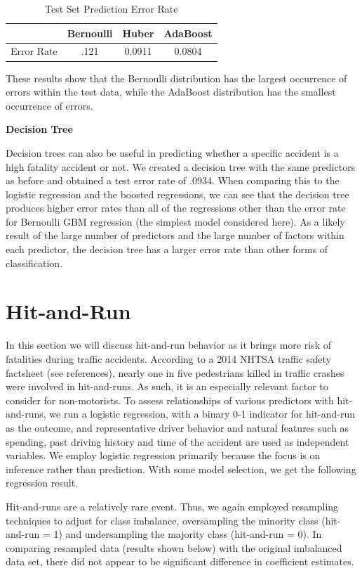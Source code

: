 \documentclass[11pt, oneside,titlepage]{article}   	%
\begin{document}
\begin{table}[H]
\centering
\begin{tabular}{cccc}
  \hline
 & Bernoulli & Huber & AdaBoost \\ 
  \hline
Error Rate & .121 & 0.0911 & 0.0804 \\ 
   \hline
\end{tabular}
\caption{Test Set Prediction Error Rate} 
\end{table}

These results show that the Bernoulli distribution has the largest occurrence of errors within the test data, while the AdaBoost distribution has the smallest occurrence of errors.

\textbf{Decision Tree}

Decision trees can also be useful in predicting whether a specific accident is a high fatality accident or not. We created a decision tree with the same predictors as before and obtained a test error rate of .0934. When comparing this to the logistic regression and the boosted regressions, we can see that the decision tree produces higher error rates than all of the regressions other than the error rate for Bernoulli GBM regression (the simplest model considered here). As a likely result of the large number of predictors and the large number of factors within each predictor, the decision tree has a larger error rate than other forms of classification.

\section*{Hit-and-Run}
In this section we will discuss hit-and-run behavior as it brings more risk of fatalities during traffic accidents. According to a 2014 NHTSA traffic safety factsheet (see references), nearly one in five pedestrians killed in traffic crashes were involved in hit-and-runs. As such, it is an especially relevant factor to consider for non-motorists. To assess relationships of various predictors with hit-and-runs, we run a logistic regression, with a binary 0-1 indicator for hit-and-run as the outcome, and representative driver behavior and natural features such as spending, past driving history and time of the accident are used as independent variables. We employ logistic regression primarily because the focus is on inference rather than prediction. With some model selection, we get the following regression result.

Hit-and-runs are a relatively rare event. Thus, we again employed resampling techniques to adjust for class imbalance, oversampling the minority class (hit-and-run = 1) and undersampling the majority class (hit-and-run = 0). In comparing resampled data (results shown below) with the original imbalanced data set, there did not appear to be significant difference in coefficient estimates.
\end{document}
